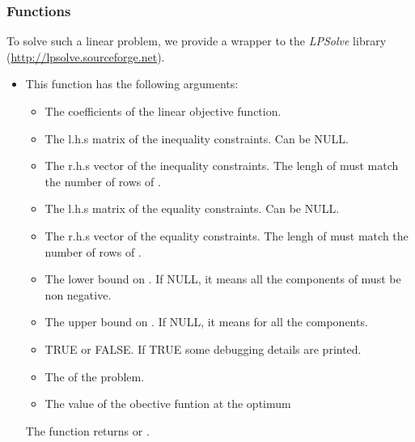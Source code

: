\subsubsection{Functions}
To solve such a linear problem, we provide a wrapper to the \emph{LPSolve} library
(\url{http://lpsolve.sourceforge.net}).
\begin{itemize}
  \item {}
    \sshortdescribe This function has the following arguments:
    \begin{itemize}
      \item {} The coefficients of the linear objective function.
      \item {} The l.h.s matrix of the inequality constraints. Can be NULL.
      \item {} The r.h.s vector of the inequality constraints. The lengh of
         must match the number of rows of .
      \item {} The l.h.s matrix of the equality constraints. Can be NULL.
      \item {} The r.h.s vector of the equality constraints. The lengh of
         must match the number of rows of .
      \item {} The lower bound on . If NULL, it means all the components
        of  must be non negative.
      \item {} The upper bound on . If NULL, it means  for
        all the components.
      \item {} TRUE or FALSE. If TRUE some debugging details are printed.
      \item {} The  of the problem.
      \item {} The value of the obective funtion at the optimum 
    \end{itemize}
    The function returns  or .


\end{itemize}
